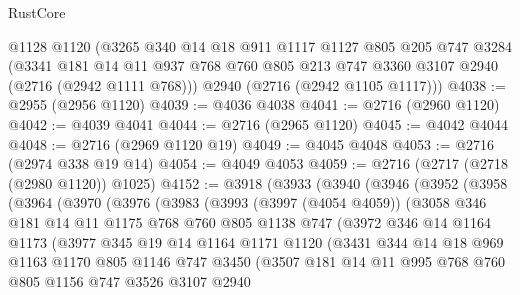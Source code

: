 \begin{lexlean}{RustCore}
\begin{coremodule}
    @1128
    @1120
    (@3265
      @340
      @14
      @18
      @911
      @1117
      @1127
      @805
      @205
      @747
      @3284
      (@3341
        @181
        @14
        @11
        @937
        @768
        @760
        @805
        @213
        @747
        @3360
        @3107
        @2940
        (@2716 (@2942 @1111 @768)))
      @2940
      (@2716 (@2942 @1105 @1117)))
@4038 := @2955 (@2956 @1120)
@4039 := @4036 @4038
@4041 := @2716 (@2960 @1120)
@4042 := @4039 @4041
@4044 := @2716 (@2965 @1120)
@4045 := @4042 @4044
@4048 := @2716 (@2969 @1120 @19)
@4049 := @4045 @4048
@4053 := @2716 (@2974 @338 @19 @14)
@4054 := @4049 @4053
@4059 := @2716 (@2717 (@2718 (@2980 @1120)) @1025)
@4152 := @3918
    (@3933
      (@3940
        (@3946
          (@3952
            (@3958
              (@3964
                (@3970
                  (@3976
                    (@3983
                      (@3993
                        (@3997 (@4054 @4059))
                        (@3058
                          @346
                          @181
                          @14
                          @11
                          @1175
                          @768
                          @760
                          @805
                          @1138
                          @747
                          (@3972
                            @346
                            @14
                            @1164
                            @1173
                            (@3977
                              @345
                              @19
                              @14
                              @1164
                              @1171
                              @1120
                              (@3431
                                @344
                                @14
                                @18
                                @969
                                @1163
                                @1170
                                @805
                                @1146
                                @747
                                @3450
                                (@3507
                                  @181
                                  @14
                                  @11
                                  @995
                                  @768
                                  @760
                                  @805
                                  @1156
                                  @747
                                  @3526
                                  @3107
                                  @2940

\end{coremodule}
\end{lexlean}
